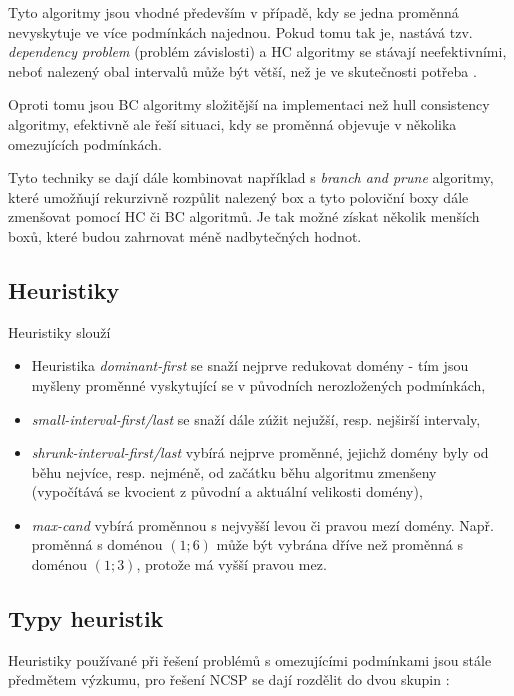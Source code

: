 Tyto algoritmy jsou vhodné především v případě, kdy se jedna proměnná nevyskytuje ve více podmínkách najednou. Pokud tomu tak je, nastává tzv. \emph{dependency problem} (problém závislosti) a HC algoritmy se stávají neefektivními, neboť nalezený obal intervalů může být větší, než je ve skutečnosti potřeba \cite{BenhamouCLPIntervals}.

Oproti tomu jsou BC algoritmy složitější na implementaci než hull consistency algoritmy, efektivně ale řeší situaci, kdy se proměnná objevuje v několika omezujících podmínkách.

Tyto techniky se dají dále kombinovat například s \emph{branch and prune} algoritmy, které umožňují rekurzivně rozpůlit nalezený box a tyto poloviční boxy dále zmenšovat pomocí HC či BC algoritmů. Je tak možné získat několik menších boxů, které budou zahrnovat méně nadbytečných hodnot.











\subsection{Heuristiky}
Heuristiky slouží

\begin{itemize}
  \item Heuristika \emph{dominant-first} se snaží nejprve redukovat domény  - tím jsou myšleny proměnné vyskytující se v původních nerozložených podmínkách,
  \item \emph{small-interval-first/last} se snaží dále zúžit nejužší, resp. nejširší intervaly,
  \item \emph{shrunk-interval-first/last} vybírá nejprve proměnné, jejichž domény byly od běhu nejvíce, resp. nejméně, od začátku běhu algoritmu zmenšeny (vypočítává se kvocient z původní a aktuální velikosti domény),
  \item \emph{max-cand} vybírá proměnnou s nejvyšší levou či pravou mezí domény. Např. proměnná s doménou $(1;6)$ může být vybrána dříve než proměnná s doménou $(1;3)$, protože má vyšší pravou mez.
\end{itemize}



\subsection{Typy heuristik}
Heuristiky používané při řešení problémů s omezujícími podmínkami jsou stále předmětem výzkumu, pro řešení NCSP se dají rozdělit do dvou skupin \cite{feiten10}:

